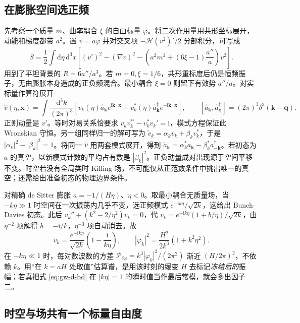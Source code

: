 \subsection{在膨胀空间选正频}

先考察一个质量 $m$、曲率耦合 $\xi$ 的自由标量 $\varphi$。将二次作用量用共形坐标展开，动能和梯度都带 $a^2$。置 $v=a\varphi$ 并对交叉项 $-\mathcal H(v^2)'/2$ 分部积分，可写成
\[
 S=\frac12\int\mathrm d\eta\,\mathrm d^3x
 \left[(v')^2-(\nabla v)^2-
 \left(a^2m^2+(6\xi-1)\frac{a''}{a}\right)v^2\right].
\]
用到了平坦背景的 $R=6a''/a^3$。若 $m=0,\xi=1/6$，共形重标度后仍是恒频振子，无由膨胀本身造成的正负频混合。最小耦合 $\xi=0$ 则留下有效势 $a''/a$。对实标量作算符展开
\[
 \widehat v(\eta,\bm x)=\int\frac{\mathrm d^3 k}{(2\pi)^3}
 \left[v_k(\eta)\widehat a_{\bm k} e^{\mathrm i\bm k\cdot\bm x}
 +v_k^*(\eta)\widehat a_{\bm k}^\dagger e^{-\mathrm i\bm k\cdot\bm x}\right],
 \qquad [\widehat a_{\bm k},\widehat a_{\bm q}^\dagger]
 =(2\pi)^3\delta^3(\bm k-\bm q).
\]
正则动量是 $v'$。等时对易关系恰要求 $v_k v_k^{*\prime}-v_k^*v_k'=\mathrm i$，模式方程保证此 Wronskian 守恒。另一组同样归一的解可写为 $\widetilde v_k=\alpha_k v_k+\beta_k v_k^*$，于是 $|\alpha_k|^2-|\beta_k|^2=1$。将同一 $\widehat v$ 用两套模式展开，得到 $\widetilde a_{\bm k}=\alpha_k^*a_{\bm k}-\beta_k^*a^\dagger_{-\bm k}$。若初态为 $a$ 的真空，以新模式计数的平均占有数是 $|\beta_k|^2$。正负动量成对出现源于空间平移不变。时空若没有全局类时 Killing 场，不可能仅从正范数条件中挑出唯一的真空；还需给出准备初态的物理边界条件。

对精确 de Sitter 膨胀 $a=-1/(H\eta)$、$\eta<0$。取最小耦合无质量场，当 $-k\eta\gg1$ 时空间在一次振荡内几乎不变，选正频模式 $e^{-\mathrm i k\eta}/\sqrt{2k}$，这给出 Bunch--Davies 初态。此后 $v_k''+(k^2-2/\eta^2)v_k=0$，代 $v_k=e^{-\mathrm i k\eta}(1+b/\eta)/\sqrt{2k}$，由 $\eta^{-2}$ 项解得 $b=-\mathrm i/k$，$\eta^{-3}$ 项自动消去。故
\begin{equation}\label{eq:gw-d-bd}
 v_k=\frac{e^{-\mathrm i k\eta}}{\sqrt{2k}}
       \left(1-\frac{\mathrm i}{k\eta}\right),\qquad
 |\varphi_k|^2=\frac{H^2}{2k^3}(1+k^2\eta^2).
\end{equation}
在 $-k\eta\ll1$ 时，每对数波数的方差 $\mathcal P_{\delta\varphi}=k^3|\varphi_k|^2/(2\pi^2)$ 渐近 $(H/2\pi)^2$，不依赖 $k$。用“在 $k=aH$ 处取值”估算谱，是用该时刻的缓变 $H$ 去标记\emph{冻结后的}振幅；若真把式 \eqref{eq:gw-d-bd} 在 $|k\eta|=1$ 的瞬时值当作最后常模，就会多出因子二。

\subsection{时空与场共有一个标量自由度}

